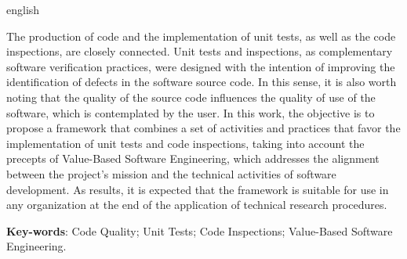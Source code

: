 \begin{resumo}[Abstract]
 \begin{otherlanguage*}{english}

   The production of code and the implementation of unit tests, as well as the code inspections, are closely connected. Unit tests and inspections, as complementary software verification practices, were designed with the intention of improving the identification of defects in the software source code. In this sense, it is also worth noting that the quality of the source code influences the quality of use of the software, which is contemplated by the user. In this work, the objective is to propose a framework that combines a set of activities and practices that favor the implementation of unit tests and code inspections, taking into account the precepts of Value-Based Software Engineering, which addresses the alignment between the project's mission and the technical activities of software development. As results, it is expected that the framework is suitable for use in any organization at the end of the application of technical research procedures.

   \vspace{\onelineskip}
 
   \noindent 
   \textbf{Key-words}: Code Quality; Unit Tests; Code Inspections; Value-Based Software Engineering.
 \end{otherlanguage*}
\end{resumo}
